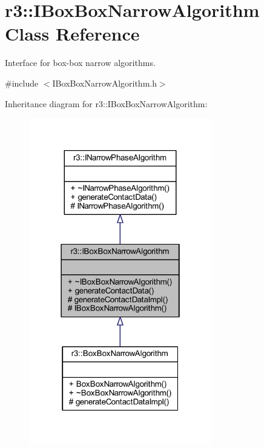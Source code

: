 \hypertarget{classr3_1_1_i_box_box_narrow_algorithm}{}\section{r3\+:\+:I\+Box\+Box\+Narrow\+Algorithm Class Reference}
\label{classr3_1_1_i_box_box_narrow_algorithm}


Interface for box-\/box narrow algorithms.  




{\ttfamily \#include $<$I\+Box\+Box\+Narrow\+Algorithm.\+h$>$}



Inheritance diagram for r3\+:\+:I\+Box\+Box\+Narrow\+Algorithm\+:\nopagebreak
\begin{figure}[H]
\begin{center}
\leavevmode
\includegraphics[width=226pt]{classr3_1_1_i_box_box_narrow_algorithm__inherit__graph}
\end{center}
\end{figure}


